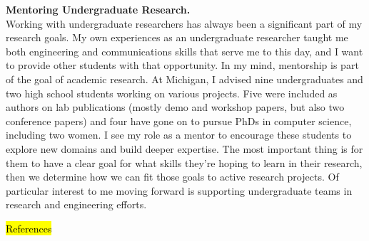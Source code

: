 \documentclass[12pt]{article} %
\begin{document}
\textbf{\textsf{\large Mentoring Undergraduate Research.}}\\
Working with undergraduate researchers has always been a significant part of my
research goals. My own experiences as an undergraduate researcher taught me
both engineering and communications skills that serve me to this day, and I
want to provide other students with that opportunity. In my mind, mentorship is
part of the goal of academic research. At Michigan, I advised nine
undergraduates and two high school students working on various projects. Five
were included as authors on lab publications (mostly demo and workshop papers,
but also two conference papers) and four have gone on to pursue PhDs in
computer science, including two women. I see my role as a mentor to encourage
these students to explore new domains and build deeper expertise. The most
important thing is for them to have a clear goal for what skills they're hoping
to learn in their research, then we determine how we can fit those goals to
active research projects. Of particular interest to me moving forward is
supporting undergraduate teams in research and engineering efforts.

\hl{References}
\end{document}
